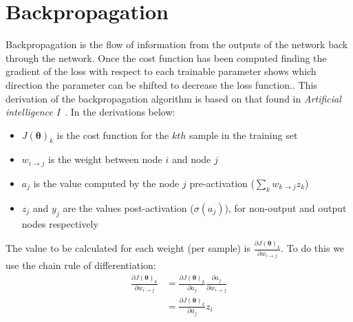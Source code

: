 \documentclass[12pt,a4paper,twoside,openright]{report}
\renewcommand{\vec}[1]{\bm{#1}}
\begin{document}




\newpage

\appendix

\chapter{Backpropagation} \label{backprop}

Backpropagation is the flow of information from the outputs of the network back through the network. Once the cost function has been computed
finding the gradient of the loss with respect to each trainable parameter shows which direction the parameter can be shifted to decrease 
the loss function.. This derivation of the backpropagation algorithm is based on that found in \textit{Artificial intelligence I}~\cite{Art_Int}.
In the derivations below:
\begin{itemize}
  \item $J(\vec{\theta})_k$ is the cost function for the $kth$ sample in the training set
  \item $w_{i \to j}$ is the weight between node $i$ and node $j$
  \item $a_j$ is the value computed by the node $j$ pre-activation ($\sum_{k} w_{k \to j} z_k$)
  \item $z_j$ and $y_j$ are the values post-activation ($\sigma(a_j)$), for non-output and output nodes respectively
\end{itemize}

The value to be calculated for each weight (per sample) is $\frac{\partial J(\vec{\theta})_k}{\partial w_{i \to j}}$. To do this we use the chain rule
of differentiation:
\begin{align}
  \frac{\partial J(\vec{\theta})_k}{\partial w_{i \to j}} & = \frac{\partial J(\vec{\theta})_k}{\partial a_j} \frac{\partial a_j}{\partial w_{i \to j}} \\
  & = \frac{\partial J(\vec{\theta})_k}{\partial a_j} z_i
\end{align}
\end{document}
